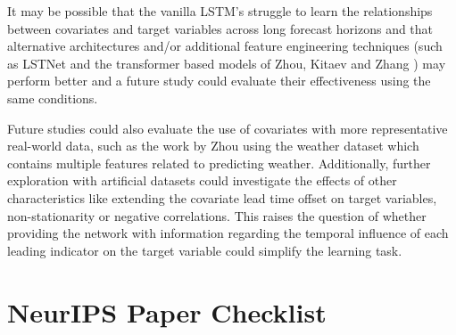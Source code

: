\documentclass{article}
\begin{document}
It may be possible that the vanilla LSTM's struggle to learn the relationships between covariates and target variables 
across long forecast horizons and that alternative architectures and/or additional feature engineering techniques (such as LSTNet \cite{lai2018modeling} and the transformer based models
 of Zhou, Kitaev and Zhang \cite{zhou2021informer,kitaev2020reformer,zhang2023crossformer}) may perform better and a future study could evaluate their effectiveness using the same conditions. 

Future studies could also evaluate the use of covariates with more representative 
real-world data, such as the work by Zhou \cite{zhou2021informer} using the weather dataset which contains multiple features related to predicting weather. 
Additionally, further exploration with artificial datasets could investigate the effects of other characteristics like 
extending the covariate lead time offset on target variables, non-stationarity or negative correlations. This raises the question of whether providing 
the network with information regarding the temporal influence of each leading indicator on the target variable could simplify the learning task.




\newpage
\section*{NeurIPS Paper Checklist}
\end{document}
